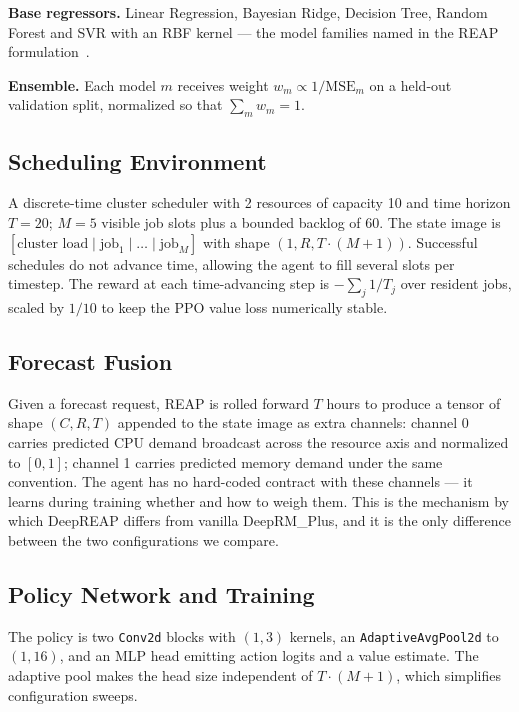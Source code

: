 \documentclass[runningheads]{llncs}
\begin{document}
\textbf{Base regressors.} Linear Regression, Bayesian Ridge, Decision
Tree, Random Forest and SVR with an RBF kernel --- the model families
named in the REAP formulation~\cite{kaur2019}.

\textbf{Ensemble.} Each model $m$ receives weight
$w_m \propto 1/\mathrm{MSE}_m$ on a held-out validation split,
normalized so that $\sum_m w_m = 1$.

\subsection{Scheduling Environment}

A discrete-time cluster scheduler with 2 resources of capacity 10 and
time horizon $T = 20$; $M = 5$ visible job slots plus a bounded
backlog of 60. The state image is
$[\text{cluster load} \mid \text{job}_1 \mid \dots \mid \text{job}_M]$
with shape $(1, R, T \cdot (M{+}1))$. Successful schedules do not
advance time, allowing the agent to fill several slots per timestep.
The reward at each time-advancing step is
$-\sum_j 1/T_j$ over resident jobs, scaled by $1/10$ to keep the PPO
value loss numerically stable.

\subsection{Forecast Fusion}

Given a forecast request, REAP is rolled forward $T$ hours to produce
a tensor of shape $(C, R, T)$ appended to the state image as extra
channels: channel 0 carries predicted CPU demand broadcast across the
resource axis and normalized to $[0,1]$; channel 1 carries predicted
memory demand under the same convention. The agent has no hard-coded
contract with these channels --- it learns during training whether and
how to weigh them. This is the mechanism by which DeepREAP differs
from vanilla DeepRM\_Plus, and it is the only difference between the
two configurations we compare.

\subsection{Policy Network and Training}

The policy is two \texttt{Conv2d} blocks with $(1,3)$ kernels, an
\texttt{AdaptiveAvgPool2d} to $(1,16)$, and an MLP head emitting
action logits and a value estimate. The adaptive pool makes the head
size independent of $T \cdot (M{+}1)$, which simplifies configuration
sweeps.
\end{document}
